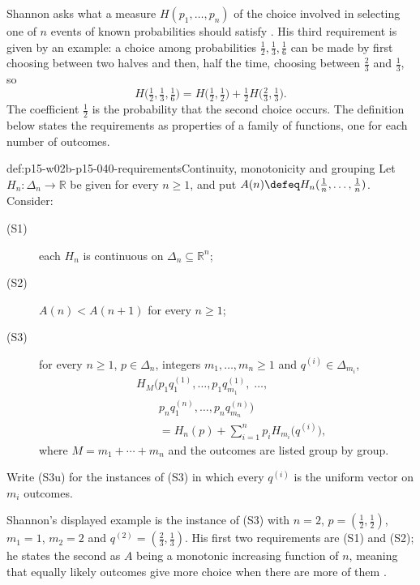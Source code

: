 Shannon asks what a measure \(H(p_1,\ldots,p_n)\) of the choice
involved in selecting one of \(n\) events of known probabilities should
satisfy \cite[p.~10]{Shannon1948MathematicalTheory}. His third
requirement is given by an example: a choice among probabilities
\(\tfrac12,\tfrac13,\tfrac16\) can be made by first choosing between
two halves and then, half the time, choosing between
\(\tfrac23\) and \(\tfrac13\), so
\[
 H\bigl(\tfrac12,\tfrac13,\tfrac16\bigr)
   =H\bigl(\tfrac12,\tfrac12\bigr)+\tfrac12H\bigl(\tfrac23,\tfrac13\bigr).
\]
The coefficient \(\tfrac12\) is the probability that the second choice
occurs. The definition below states the requirements as properties of a
family of functions, one for each number of outcomes.

\begin{hbdefinition}{def:p15-w02b-p15-040-requirements}{Continuity, monotonicity and grouping}
Let \(H_n:\Delta_n\to\mathbb R\) be given for every \(n\geq1\), and put
\(A(n)\defeq H_n(\tfrac1n,\ldots,\tfrac1n)\). Consider:
\begin{description}
\item[(S1)] each \(H_n\) is continuous on \(\Delta_n\subseteq\mathbb R^n\);
\item[(S2)] \(A(n)<A(n+1)\) for every \(n\geq1\);
\item[(S3)] for every \(n\geq1\), \(p\in\Delta_n\), integers
\(m_1,\ldots,m_n\geq1\) and \(q^{(i)}\in\Delta_{m_i}\),
\[
 \begin{aligned}
 &H_M\bigl(p_1q^{(1)}_1,\ldots,p_1q^{(1)}_{m_1},\;\ldots,\\
 &\qquad p_nq^{(n)}_1,\ldots,p_nq^{(n)}_{m_n}\bigr)\\
 &\qquad=H_n(p)+\sum_{i=1}^np_iH_{m_i}\bigl(q^{(i)}\bigr),
 \end{aligned}
\]
where \(M=m_1+\cdots+m_n\) and the outcomes are listed group by group.
\end{description}
Write (S3u) for the instances of (S3) in which every \(q^{(i)}\) is the
uniform vector on \(m_i\) outcomes.
\end{hbdefinition}

Shannon's displayed example is the instance of (S3) with \(n=2\),
\(p=(\tfrac12,\tfrac12)\), \(m_1=1\), \(m_2=2\) and
\(q^{(2)}=(\tfrac23,\tfrac13)\). His first two requirements are (S1)
and (S2); he states the second as \(A\) being a monotonic increasing
function of \(n\), meaning that equally likely outcomes give more choice
when there are more of them \cite[p.~10]{Shannon1948MathematicalTheory}.

